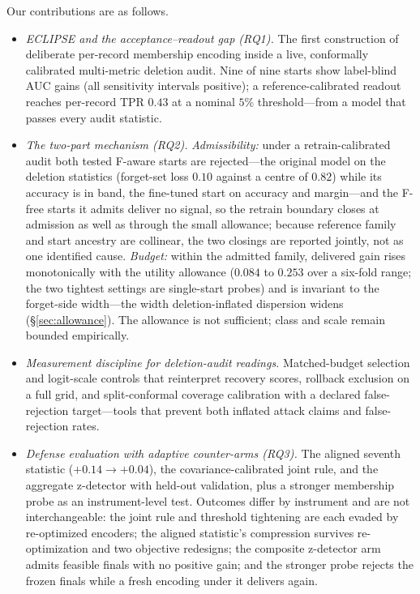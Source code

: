 \documentclass[lettersize,journal]{IEEEtran}
\begin{document}
Our contributions are as follows.
\begin{itemize}
\item \emph{ECLIPSE and the acceptance--readout gap (RQ1).}
The first construction of deliberate per-record membership
encoding inside a live, conformally calibrated multi-metric
deletion audit. Nine of nine starts show label-blind AUC
gains (all sensitivity intervals positive); a
reference-calibrated readout reaches per-record TPR $0.43$
at a nominal $5\%$ threshold---from a model that passes
every audit statistic.
\item \emph{The two-part mechanism (RQ2).} \emph{Admissibility:}
under a retrain-calibrated audit both tested F-aware starts are
rejected---the original model on the deletion statistics
(forget-set loss $0.10$ against a centre of $0.82$) while its
accuracy is in band, the fine-tuned start on accuracy and
margin---and the F-free starts it admits deliver no signal, so
the retrain boundary closes at admission as well as through
the small allowance; because reference family and start
ancestry are collinear, the two closings are reported jointly,
not as one identified cause. \emph{Budget:} within the admitted
family, delivered gain rises monotonically with the utility
allowance ($0.084$ to $0.253$ over a six-fold range; the two
tightest settings are single-start probes) and is invariant to
the forget-side width---the width deletion-inflated dispersion
widens (\S\ref{sec:allowance}). The allowance is not
sufficient; class and scale remain bounded empirically.
\item \emph{Measurement discipline for deletion-audit
readings.} Matched-budget selection and logit-scale controls
that reinterpret recovery scores, rollback exclusion on a
full grid, and split-conformal coverage calibration with a
declared false-rejection target---tools that prevent both
inflated attack claims and false-rejection rates.
\item \emph{Defense evaluation with adaptive counter-arms
(RQ3).} The aligned seventh statistic
($+0.14\to+0.04$), the covariance-calibrated joint rule,
and the aggregate z-detector with held-out validation,
plus a stronger membership probe as an instrument-level
test. Outcomes differ by instrument and are not
interchangeable: the joint rule and threshold tightening are
each evaded by re-optimized encoders; the aligned statistic's
compression survives re-optimization and two objective
redesigns; the composite z-detector arm admits feasible finals
with no positive gain; and the stronger probe rejects the
frozen finals while a fresh encoding under it delivers again.
\end{itemize}
\end{document}
